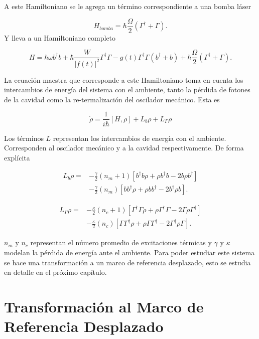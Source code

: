 \documentclass[10pt,a4paper]{report}
\begin{document}
A este Hamiltoniano se le agrega un término correspondiente a una bomba láser

\begin{equation}
H_{bomba}= \hbar \frac{\Omega}{2}(\Gamma^\dagger + \Gamma).
\end{equation} Y lleva a un Hamiltoniano completo

\begin{equation}
H = \hbar \omega b^\dagger b + \hbar\frac{ W}{|f(t)|^2}\Gamma^\dagger \Gamma -g(t)\Gamma^\dagger \Gamma(b^\dagger + b) + \hbar \frac{\Omega}{2}(\Gamma^\dagger + \Gamma).
\end{equation}

 La ecuación maestra que corresponde a este Hamiltoniano toma en cuenta los intercambios de energía del sistema con el ambiente, tanto la pérdida de fotones de la cavidad como la re-termalización del oscilador mecánico. Esta es \cite{BarberisLC}

\begin{equation} \label{LCMasterEquation}
\dot{\rho} = \frac{1}{i\hbar}[H,\rho] +L_b\rho + L_\Gamma \rho
\end{equation}

Los términos $L$ representan los intercambios de energía con el ambiente. Corresponden al oscilador mecánico y a la cavidad respectivamente. De forma explícita

\begin{align}
L_b \rho =& - \frac{\gamma}{2}(n_m + 1)[b^\dagger b\rho + \rho b^\dagger b -2b\rho b^\dagger]  \\
 &- \frac{\gamma}{2}(n_m)[ bb^\dagger\rho + \rho  bb^\dagger -2b^\dagger\rho b].\nonumber
\end{align} 

\begin{align}
L_\Gamma \rho =& - \frac{\kappa}{2}(n_c + 1)[\Gamma^\dagger \Gamma\rho + \rho \Gamma^\dagger \Gamma -2\Gamma\rho \Gamma^\dagger]  \\
 &- \frac{\kappa}{2}(n_c)[ \Gamma\Gamma^\dagger\rho + \rho  \Gamma\Gamma^\dagger -2\Gamma^\dagger\rho \Gamma].\nonumber
\end{align}

$n_m$ y $n_c$ representan el número promedio de excitaciones térmicas y $\gamma$ y $\kappa$ modelan la pérdida de energía ante el ambiente. Para poder estudiar este sistema se hace una transformación a  un marco de referencia desplazado, esto se estudia en detalle en el próximo capítulo.

\chapter{Transformación al Marco de Referencia Desplazado}
\end{document}
